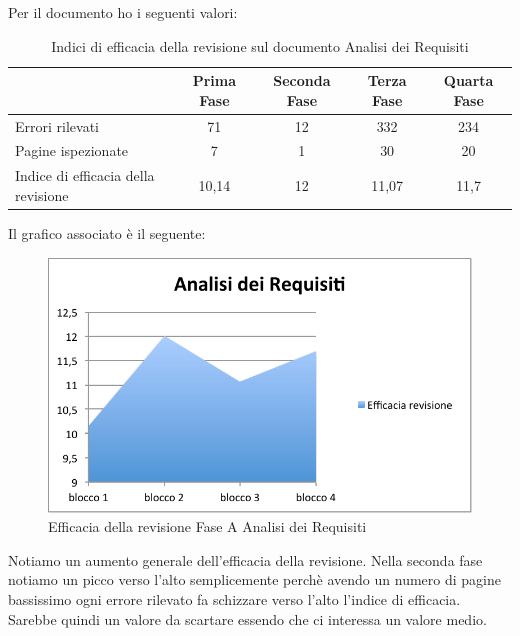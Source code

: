 						Per il documento  ho i seguenti valori:	
						\begin{table}[H]\centering
							\begin{tabu}{| l | c | c | c | c |}
								\hline
													&Prima Fase 	& Seconda Fase	& Terza Fase	& Quarta Fase  \\ \hline
												
								Errori rilevati				& 71		& 12 		& 332			& 234 	 \\ \hline
								Pagine ispezionate			& 7		& 1 		& 30			& 20 	 \\ \hline\hline
							
								Indice di efficacia della revisione 	 & 10,14		& 12 		& 11,07			& 11,7 	 \\ \hline
							\end{tabu}
							\caption{Indici di efficacia della revisione sul documento Analisi dei Requisiti}
						\end{table}
						Il grafico associato è il seguente:
						\begin{figure}[H]\centering
							\includegraphics[width=12cm]{PianoDiQualifica/Pics/EfficaciaAdRFaseA.pdf}
							\caption{Efficacia della revisione Fase A Analisi dei Requisiti}
						\end{figure}
						Notiamo un aumento generale dell'efficacia della revisione. Nella seconda fase notiamo un picco verso l'alto semplicemente perchè avendo un numero di pagine bassissimo ogni errore rilevato fa schizzare verso l'alto l'indice di efficacia. Sarebbe quindi un valore da scartare essendo che ci interessa un valore medio.\\
					
